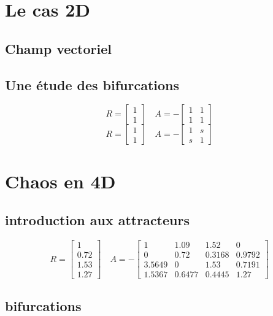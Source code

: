 \documentclass{wsdcr}
\begin{document}
\section{Le cas 2D}
\subsection{Champ vectoriel}
\subsection{Une étude des bifurcations}
\begin{equation}
R={\begin{bmatrix}1\\1\end{bmatrix}}\quad A =-{\begin{bmatrix}1&1\\1&1\end{bmatrix}}
\end{equation}
\begin{equation}
R={\begin{bmatrix}1\\1\end{bmatrix}}\quad A =-{\begin{bmatrix}1&s\\s&1\end{bmatrix}}
\end{equation}
\section{Chaos en 4D}
\subsection{introduction aux attracteurs}
\begin{equation}
R={\begin{bmatrix}1\\0.72\\1.53\\1.27\end{bmatrix}}\quad A =-{\begin{bmatrix}1&1.09&1.52&0\\0&0.72&0.3168&0.9792\\3.5649&0&1.53&0.7191\\1.5367&0.6477&0.4445&1.27\end{bmatrix}}
\end{equation}
\subsection{bifurcations}
\end{document}
